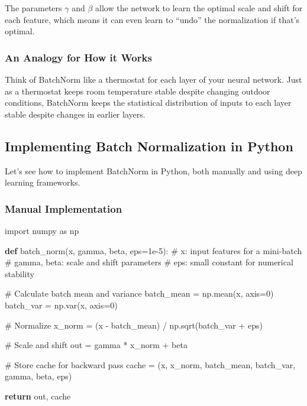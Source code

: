 \documentclass[
  letterpaper,
  DIV=11,
  numbers=noendperiod]{scrreprt}
\newenvironment{Shaded}{\begin{snugshade}}{\end{snugshade}}
\newcommand{\CommentTok}[1]{\textcolor[rgb]{0.37,0.37,0.37}{#1}}
\newcommand{\ControlFlowTok}[1]{\textcolor[rgb]{0.00,0.23,0.31}{\textbf{#1}}}
\newcommand{\DecValTok}[1]{\textcolor[rgb]{0.68,0.00,0.00}{#1}}
\newcommand{\FloatTok}[1]{\textcolor[rgb]{0.68,0.00,0.00}{#1}}
\newcommand{\ImportTok}[1]{\textcolor[rgb]{0.00,0.46,0.62}{#1}}
\newcommand{\KeywordTok}[1]{\textcolor[rgb]{0.00,0.23,0.31}{\textbf{#1}}}
\newcommand{\NormalTok}[1]{\textcolor[rgb]{0.00,0.23,0.31}{#1}}
\newcommand{\OperatorTok}[1]{\textcolor[rgb]{0.37,0.37,0.37}{#1}}
\begin{document}
The parameters \(\gamma\) and \(\beta\) allow the network to learn the
optimal scale and shift for each feature, which means it can even learn
to ``undo'' the normalization if that's optimal.

\subsubsection{An Analogy for How it
Works}\label{an-analogy-for-how-it-works}

Think of BatchNorm like a thermostat for each layer of your neural
network. Just as a thermostat keeps room temperature stable despite
changing outdoor conditions, BatchNorm keeps the statistical
distribution of inputs to each layer stable despite changes in earlier
layers.

\subsection{Implementing Batch Normalization in
Python}\label{implementing-batch-normalization-in-python}

Let's see how to implement BatchNorm in Python, both manually and using
deep learning frameworks.

\subsubsection{Manual Implementation}\label{manual-implementation}

\begin{Shaded}
\begin{Highlighting}[]
\ImportTok{import}\NormalTok{ numpy }\ImportTok{as}\NormalTok{ np}

\KeywordTok{def}\NormalTok{ batch\_norm(x, gamma, beta, eps}\OperatorTok{=}\FloatTok{1e{-}5}\NormalTok{):}
    \CommentTok{\# x: input features for a mini{-}batch}
    \CommentTok{\# gamma, beta: scale and shift parameters}
    \CommentTok{\# eps: small constant for numerical stability}
    
    \CommentTok{\# Calculate batch mean and variance}
\NormalTok{    batch\_mean }\OperatorTok{=}\NormalTok{ np.mean(x, axis}\OperatorTok{=}\DecValTok{0}\NormalTok{)}
\NormalTok{    batch\_var }\OperatorTok{=}\NormalTok{ np.var(x, axis}\OperatorTok{=}\DecValTok{0}\NormalTok{)}
    
    \CommentTok{\# Normalize}
\NormalTok{    x\_norm }\OperatorTok{=}\NormalTok{ (x }\OperatorTok{{-}}\NormalTok{ batch\_mean) }\OperatorTok{/}\NormalTok{ np.sqrt(batch\_var }\OperatorTok{+}\NormalTok{ eps)}
    
    \CommentTok{\# Scale and shift}
\NormalTok{    out }\OperatorTok{=}\NormalTok{ gamma }\OperatorTok{*}\NormalTok{ x\_norm }\OperatorTok{+}\NormalTok{ beta}
    
    \CommentTok{\# Store cache for backward pass}
\NormalTok{    cache }\OperatorTok{=}\NormalTok{ (x, x\_norm, batch\_mean, batch\_var, gamma, beta, eps)}
    
    \ControlFlowTok{return}\NormalTok{ out, cache}
\end{Highlighting}
\end{Shaded}
\end{document}
